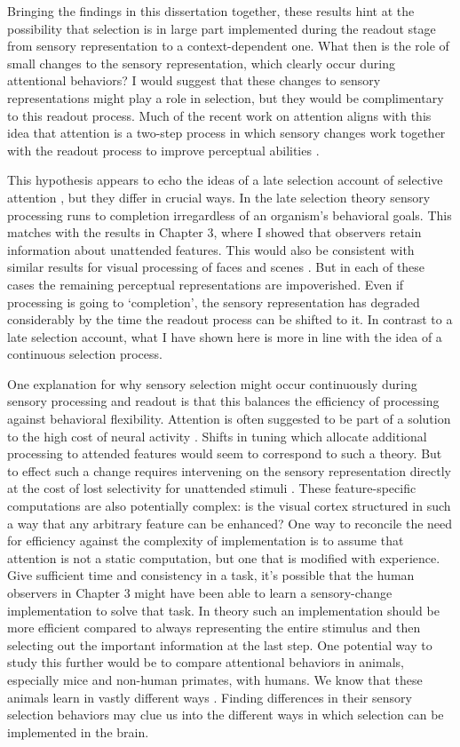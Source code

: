 Bringing the findings in this dissertation together, these results hint at the possibility that selection is in large part implemented during the readout stage from sensory representation to a context-dependent one. What then is the role of small changes to the sensory representation, which clearly occur during attentional behaviors? I would suggest that these changes to sensory representations might play a role in selection, but they would be complimentary to this readout process. Much of the recent work on attention aligns with this idea that attention is a two-step process in which sensory changes work together with the readout process to improve perceptual abilities \citep{Pestilli2011-gi,Ruff2018-bm,Snyder2018-yr,Rabinowitz2015-uz}.

This hypothesis appears to echo the ideas of a late selection account of selective attention \citep{Deutsch1963-ac}, but they differ in crucial ways. In the late selection theory sensory processing runs to completion irregardless of an organism's behavioral goals. This matches with the results in Chapter 3, where I showed that observers retain information about unattended features. This would also be consistent with similar results for visual processing of faces and scenes \citep{Li2002-ji,Reddy2006-ua}. But in each of these cases the remaining perceptual representations are impoverished. Even if processing is going to `completion', the sensory representation has degraded considerably by the time the readout process can be shifted to it. In contrast to a late selection account, what I have shown here is more in line with the idea of a continuous selection process.

One explanation for why sensory selection might occur continuously during sensory processing and readout is that this balances the efficiency of processing against behavioral flexibility. Attention is often suggested to be part of a solution to the high cost of neural activity \citep{Lennie2003-ee}. Shifts in tuning which allocate additional processing to attended features would seem to correspond to such a theory. But to effect such a change requires intervening on the sensory representation directly at the cost of lost selectivity for unattended stimuli \citep{Mack1998-nq}. These feature-specific computations are also potentially complex: is the visual cortex structured in such a way that any arbitrary feature can be enhanced? One way to reconcile the need for efficiency against the complexity of implementation is to assume that attention is not a static computation, but one that is modified with experience. Give sufficient time and consistency in a task, it's possible that the human observers in Chapter 3 might have been able to learn a sensory-change implementation to solve that task. In theory such an implementation should be more efficient compared to always representing the entire stimulus and then selecting out the important information at the last step. One potential way to study this further would be to compare attentional behaviors in animals, especially mice and non-human primates, with humans. We know that these animals learn in vastly different ways \citep{Birman2015-fj}. Finding differences in their sensory selection behaviors may clue us into the different ways in which selection can be implemented in the brain.
